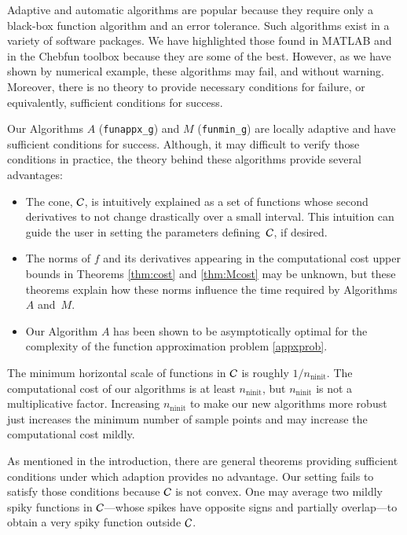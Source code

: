 \documentclass[review]{elsarticle}
\theoremstyle{definition}
\DeclareMathOperator{\ninit}{ninit}
\newcommand{\funappxg}{\texttt{funappx\_g}\xspace}
\newcommand{\funming}{\texttt{funmin\_g}\xspace}
\begin{document}
Adaptive and automatic algorithms are popular because they require only a
black-box function algorithm and an error tolerance. Such algorithms exist in a
variety of software packages. We have highlighted those found in MATLAB and in
the Chebfun toolbox because they are some of the best. However, as we have shown
by numerical example, these algorithms may fail, and without warning. Moreover,
there is no theory to provide necessary conditions for failure, or equivalently,
sufficient conditions for success.

Our Algorithms $A$ (\funappxg) and $M$ (\funming) are locally adaptive and have
sufficient conditions for success. Although, it may difficult to
verify those conditions in practice, the theory behind these algorithms provide
several advantages: 

\begin{itemize}
	
\item The cone, $\mathcal{C}$, is intuitively explained as a set of functions whose  second 
derivatives to not change drastically over a small interval.
This intuition can guide the user in setting the parameters defining~$\mathcal{C}$, if
 desired.
	
\item The norms of $f$ and its derivatives appearing in the computational cost
upper bounds in Theorems \ref{thm:cost} and \ref{thm:Mcost} may be unknown, but 
these theorems explain how these norms influence the time required by
Algorithms $A$ and~$M$.
	
\item Our Algorithm $A$ has been shown to be asymptotically optimal for the
complexity of the function approximation problem \eqref{appxprob}.
	
\end{itemize}

The minimum horizontal scale of functions in $\mathcal{C}$ is roughly $1/n_{\ninit}$. The 
computational cost of our algorithms is at least $n_{\ninit}$, but $n_{\ninit}$ is not a
multiplicative factor. Increasing $n_{\ninit}$ to make our new algorithms more robust
just increases the minimum number of sample points and may increase the
computational cost mildly.

As mentioned in the introduction, there are general theorems providing sufficient 
conditions under which adaption provides
no advantage. Our setting fails to satisfy those conditions because $\mathcal{C}$ is not
convex. One may average two mildly spiky functions in $\mathcal{C}$---whose spikes have
opposite signs and partially overlap---to obtain a very spiky function outside
$\mathcal{C}$.
\end{document}
